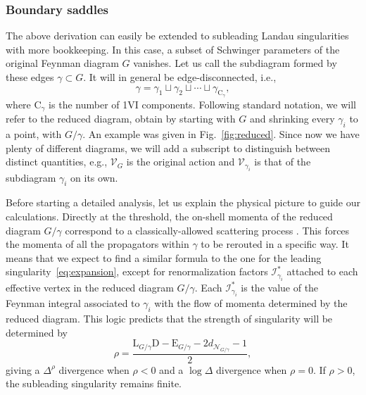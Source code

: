 \documentclass[12pt]{article}
\numberwithin{figure}{section}
\def \be {\begin{equation}}
\def \ee {\end{equation}}
\def \CC {C}
\def \D {\mathrm{D}}
\def \E {\mathrm{E}}
\def \L {\mathrm{L}}
\def \V {\mathcal{V}}
\def \CC {\mathrm{C}}
\def \N {\mathcal{N}}
\def \RR {\mathcal{I}^\ast}
\def \upgamma {\rho}
\begin{document}
	
	\subsubsection{\label{sec:boundary-saddles}Boundary saddles}
				
	The above derivation can easily be extended to subleading Landau singularities with more bookkeeping. In this case, a subset of Schwinger parameters of the original Feynman diagram $G$ vanishes. Let us call the subdiagram formed by these edges $\gamma \subset G$. It will in general be edge-disconnected, i.e.,
                \be
                \gamma = \gamma_1 \sqcup \gamma_2 \sqcup \cdots \sqcup \gamma_{\CC_\gamma},
                \ee
				where $\CC_\gamma$ is the number of 1VI components. Following standard notation, we will refer to the reduced diagram, obtain by starting with $G$ and shrinking every $\gamma_i$ to a point, with $G/\gamma$. An example was given in Fig.~\ref{fig:reduced}. Since now we have plenty of different diagrams, we will add a subscript to distinguish between distinct quantities, e.g., $\V_G$ is the original action and $\V_{\gamma_i}$ is that of the subdiagram $\gamma_i$ on its own.
    			
        	    
        	    Before starting a detailed analysis, let us explain the physical picture to guide our calculations. Directly at the threshold, the on-shell momenta of the reduced diagram $G/\gamma$ correspond to a classically-allowed scattering process \cite{Coleman:1965xm}. This forces the momenta of all the propagators within $\gamma$ to be rerouted in a specific way. It means that we expect to find a similar formula to the one for the leading singularity~\eqref{eq:expansion}, except for renormalization factors $\RR_{\gamma_i}$ attached to each effective vertex in the reduced diagram $G/\gamma$. Each $\RR_{\gamma_i}$ is the value of the Feynman integral associated to $\gamma_i$ with the flow of momenta determined by the reduced diagram. This logic predicts that the strength of singularity will be determined by
        	    \be\label{eq:nu-subleading}
        	    \boxed{
        	    \upgamma = \frac{\L_{G/\gamma}\D - \E_{G/\gamma} - 2d_{\N_{G/\gamma}} -1}{2},}
        	    \ee
        	    giving a $\Delta^{\upgamma}$ divergence when $\upgamma < 0$ and a $\log \Delta$ divergence when $\upgamma=0$. If $\upgamma>0$, the subleading singularity remains finite.
        	    
\end{document}
